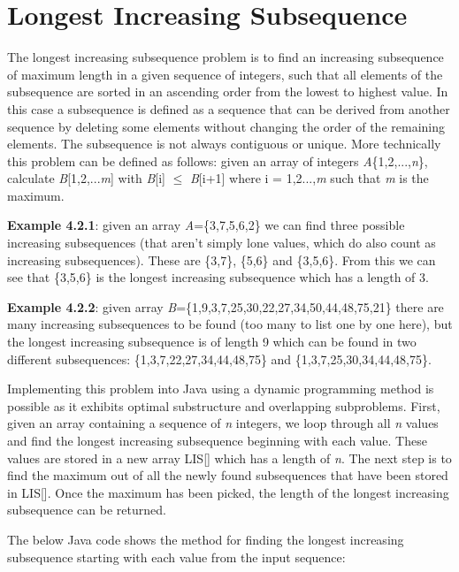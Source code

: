 \section{Longest Increasing Subsequence}


The longest increasing subsequence problem is to find an increasing subsequence of maximum length in a given sequence of integers, such that all elements of the subsequence are sorted in an ascending order from the lowest to highest value. In this case a subsequence is defined as a sequence that can be derived from another sequence by deleting some elements without changing the order of the remaining elements. The subsequence is not always contiguous or unique. More technically this problem can be defined as follows: given an array of integers \textit{A}\{1,2,...,\textit{n}\}, calculate \textit{B}[1,2,...\textit{m}] with \textit{B}[i] $\leq$ \textit{B}[i+1] where i = 1,2...,\textit{m} such that \textit{m} is the maximum.

\medbreak
\textbf{Example 4.2.1}: given an array \textit{A}=\{3,7,5,6,2\} we can find three possible increasing subsequences (that aren't simply lone values, which do also count as increasing subsequences). These are \{3,7\}, \{5,6\} and \{3,5,6\}. From this we can see that \{3,5,6\} is the longest increasing subsequence which has a length of 3.

\smallbreak
\textbf{Example 4.2.2}: given array \textit{B}=\{1,9,3,7,25,30,22,27,34,50,44,48,75,21\} there are many increasing subsequences to be found (too many to list one by one here), but the longest increasing subsequence is of length 9 which can be found in two different subsequences: \{1,3,7,22,27,34,44,48,75\} and \{1,3,7,25,30,34,44,48,75\}.

\medbreak\noindent
Implementing this problem into Java using a dynamic programming method is possible as it exhibits optimal substructure and overlapping subproblems. First, given an array containing a sequence of \textit{n} integers, we loop through all \textit{n} values and find the longest increasing subsequence beginning with each value. These values are stored in a new array LIS[] which has a length of \textit{n}. The next step is to find the maximum out of all the newly found subsequences that have been stored in LIS[]. Once the maximum has been picked, the length of the longest increasing subsequence can be returned.
\smallbreak\noindent

The below Java code shows the method for finding the longest increasing subsequence starting with each value from the input sequence:

